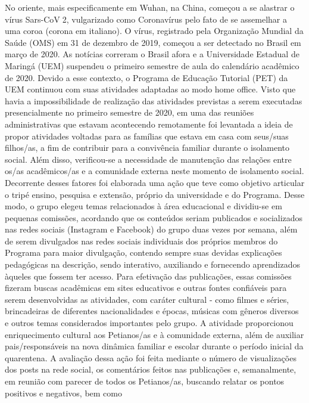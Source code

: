 No oriente, mais especificamente em Wuhan, na China, começou a se alastrar o vírus Sars-CoV2, vulgarizado como Coronavírus pelo fato de se assemelhar a uma coroa (corona em italiano). O 
vírus, registrado pela Organização Mundial da Saúde (OMS) em 31 de dezembro de 2019, 
começou a ser detectado no Brasil em março de 2020. As notícias correram o Brasil afora e a 
Universidade Estadual de Maringá (UEM) suspendeu o primeiro semestre de aula do calendário 
acadêmico de 2020. Devido a esse contexto, o Programa de Educação Tutorial (PET) da UEM 
continuou com suas atividades adaptadas ao modo home office. Visto que havia a impossibilidade 
de realização das atividades previstas a serem executadas presencialmente no primeiro semestre 
de 2020, em uma das reuniões administrativas que estavam acontecendo remotamente foi 
levantada a ideia de propor atividades voltadas para as famílias que estava em casa com seus/suas 
filhos/as, a fim de contribuir para a convivência familiar durante o isolamento social. Além disso, 
verificou-se a necessidade de manutenção das relações entre os/as acadêmicos/as e a comunidade 
externa neste momento de isolamento social. Decorrente desses fatores foi elaborada uma ação 
que teve como objetivo articular o tripé ensino, pesquisa e extensão, próprio da universidade e do 
Programa. Desse modo, o grupo elegeu temas relacionados à área educacional e dividiu-se em 
pequenas comissões, acordando que os conteúdos seriam publicados e socializados nas redes 
sociais (Instagram e Facebook) do grupo duas vezes por semana, além de serem divulgados nas 
redes sociais individuais dos próprios membros do Programa para maior divulgação, contendo 
sempre suas devidas explicações pedagógicas na descrição, sendo interativo, auxiliando e 
fornecendo aprendizados àqueles que fossem ter acesso. Para efetivação das publicações, essas 
comissões fizeram buscas acadêmicas em sites educativos e outras fontes confiáveis para serem 
desenvolvidas as atividades, com caráter cultural - como filmes e séries, brincadeiras de diferentes 
nacionalidades e épocas, músicas com gêneros diversos e outros temas considerados importantes 
pelo grupo. A atividade proporcionou enriquecimento cultural aos Petianos/as e à comunidade 
externa, além de auxiliar pais/responsáveis na nova dinâmica familiar e escolar durante o período 
inicial da quarentena. A avaliação dessa ação foi feita mediante o número de visualizações dos 
posts na rede social, os comentários feitos nas publicações e, semanalmente, em reunião com 
parecer de todos os Petianos/as, buscando relatar os pontos positivos e negativos, bem como 
